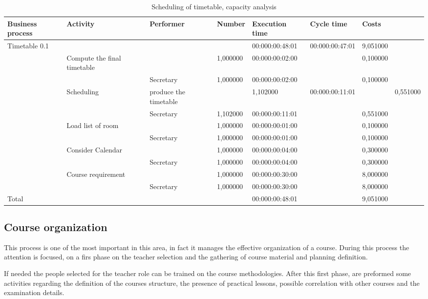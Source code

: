\begin{landscape}
\centering
\begin{table}
{\tiny
\begin{tabular}{|l|l|l|l|l|l|l|}
Business process&Activity&Performer&Number&Execution time&Cycle
time&Costs\\
\hline
Timetable 0.1&&&&00:000:00:48:01&00:000:00:47:01&9,051000\\
\hline
&Compute the final timetable &&1,000000&00:000:00:02:00&&0,100000\\
\hline
&&Secretary &1,000000&00:000:00:02:00&&0,100000\\
\hline
&Scheduling & produce the timetable &&1,102000&00:000:00:11:01&&0,551000\\
\hline
&&Secretary &1,102000&00:000:00:11:01&&0,551000\\
\hline
&Load list of room &&1,000000&00:000:00:01:00&&0,100000\\
\hline
&&Secretary &1,000000&00:000:00:01:00&&0,100000\\
\hline
&Consider Calendar &&1,000000&00:000:00:04:00&&0,300000\\
\hline
&&Secretary &1,000000&00:000:00:04:00&&0,300000\\
\hline
&Course requirement &&1,000000&00:000:00:30:00&&8,000000\\
\hline
&&Secretary &1,000000&00:000:00:30:00&&8,000000\\
\hline
Total&&&&00:000:00:48:01&&9,051000\\
\hline
\end{tabular}
}
\caption{Scheduling of timetable, capacity analysis} 
\label{2tab:timetab}
\end{table}
\end{landscape}





\subsection{Course organization}
This process is one of the most important in this area, in fact it manages
the effective organization of a course. During this process the attention
is focused, on a firs phase on the teacher selection and the gathering of
course material and planning definition.

If needed the people selected for the teacher role can be trained on the
course methodologies. After this first phase, are preformed  some
activities regarding the definition of the courses structure, the presence
of practical lessons, possible correlation with other courses and the
examination details.

